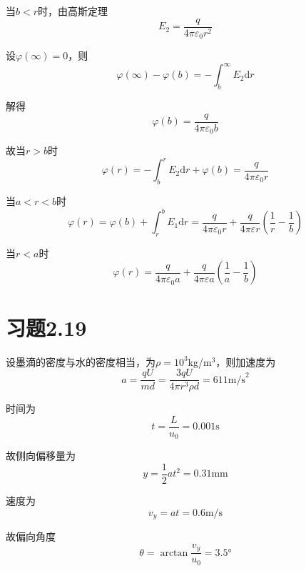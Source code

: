 \documentclass{SCIS2020cn}
\begin{document}
当$b<r$时，由高斯定理
\begin{equation}
    E_2=\frac{q}{4\pi\varepsilon_0r^2}
\end{equation}

设$\varphi(\infty)=0$，则
\begin{equation}
    \varphi(\infty)-\varphi(b)=-\int_b^{\infty}E_2\text{d}r
\end{equation}

解得
\begin{equation}
    \varphi(b)=\frac{q}{4\pi\varepsilon_0b}
\end{equation}

故当$r>b$时
\begin{equation}
    \varphi(r)=-\int_b^rE_2\text{d}r+\varphi(b)=\frac{q}{4\pi\varepsilon_0r}
\end{equation}

当$a<r<b$时
\begin{equation}
    \varphi(r)=\varphi(b)+\int_r^bE_1\text{d}r=\frac{q}{4\pi\varepsilon_0r}+\frac{q}{4\pi\varepsilon{}r}\left(\frac{1}{r}-\frac{1}{b}\right)
\end{equation}

当$r<a$时
\begin{equation}
    \varphi(r)=\frac{q}{4\pi\varepsilon_0a}+\frac{q}{4\pi\varepsilon{}a}\left(\frac{1}{a}-\frac{1}{b}\right)
\end{equation}

\section{习题2.19}
设墨滴的密度与水的密度相当，为$\rho=10^3$kg/$\text{m}^3$，则加速度为
\begin{equation}
    a=\frac{qU}{md}=\frac{3qU}{4\pi{}r^3\rho{}d}=611\text{m/s}^2
\end{equation}

时间为
\begin{equation}
    t=\frac{L}{u_0}=0.001\text{s}
\end{equation}

故侧向偏移量为
\begin{equation}
    y=\frac{1}{2}at^2=0.31\text{mm}
\end{equation}

速度为
\begin{equation}
    v_y=at=0.6\text{m/s}
\end{equation}

故偏向角度
\begin{equation}
    \theta=\arctan{\frac{v_y}{u_0}}=3.5°
\end{equation}
\end{document}

